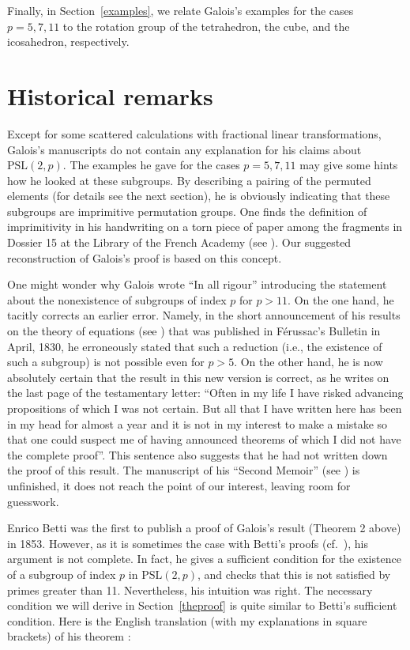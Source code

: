 \documentclass[reqno,12pt]{amsart}
\theoremstyle{definition}
\newcommand{\PSL}{\mathrm{PSL}}
\begin{document}
Finally, in Section~\ref{examples}, we relate Galois's examples for the cases
$p=5,7,11$ to the rotation group of the tetrahedron, the cube, and the
icosahedron, respectively.

\section{Historical remarks}\label{historical}

Except for some scattered calculations with fractional linear transformations, Galois's manu\-scripts do
not contain any explanation for his claims about $\PSL(2,p)$. The examples he gave for the cases
$p=5,7,11$ may give some hints how he looked at these subgroups. By describing a pairing of the
permuted elements (for details see the next section), he is obviously indicating that these subgroups
are imprimitive permutation groups. One finds the definition of imprimitivity
in his handwriting on a torn piece of paper among the fragments
in Dossier 15 at the Library of the French Academy (see \cite[p.~289]{Neumann}). Our suggested
reconstruction of Galois's proof is based on this concept.

One might wonder why Galois wrote ``In all rigour'' introducing the statement about the
nonexistence of subgroups of index $p$ for $p>11$. On the one hand, he tacitly corrects an
earlier error. Namely, in the short announcement of his results on the theory of equations
(see \cite[p.~53]{Neumann}) that was published in F\'erussac's Bulletin in April, 1830, he
erroneously stated that such a reduction (i.e., the existence of such a subgroup) is not
possible even for $p>5$. On the other hand, he is now absolutely certain that the result in
this new version is correct, as he writes on the last page of the testamentary letter: ``Often in my life
I have risked advancing propositions of which I was not certain. But all that I have written here
has been in my head for almost a year and it is not in my interest to make a mistake so that one
could suspect me of having announced theorems of which I did not have the complete proof''.
This sentence also suggests that he had not written down the proof of this result. The manuscript
of his ``Second Memoir'' (see \cite[Chapter V]{Neumann}) is unfinished, it does not reach the
point of our interest, leaving room for guesswork.

Enrico Betti \cite{Betti} was the first to publish a proof of Galois's result (Theorem 2 above)
in 1853.
However, as it is sometimes the case with Betti's proofs (cf.~\cite{Mammone}), his argument is
not complete. In fact, he gives a sufficient condition for the existence of a subgroup of
index $p$ in $\PSL(2,p)$, and checks that this is not satisfied by primes greater than 11.
Nevertheless, his intuition was right. The necessary condition we will derive in
Section~\ref{theproof} is quite similar to Betti's sufficient condition. Here is the English
translation (with my explanations in square brackets) of his theorem :
\end{document}
